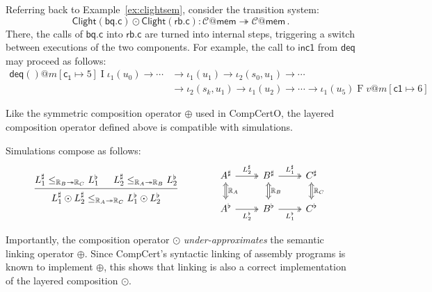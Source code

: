 \documentclass[acmsmall,screen,review,anonymous]{acmart}
\newcommand{\kw}[1]{\ensuremath{ \mathsf{#1} }}
\begin{document}
\begin{example}
Referring back to Example~\ref{ex:clightsem},
consider the transition system:
\[
  \kw{Clight}(\kw{bq.c}) \odot \kw{Clight}(\kw{rb.c}) :
  \mathcal{C}@\kw{mem} \twoheadrightarrow \mathcal{C}@\kw{mem}
  \,.
\]
There,
the calls of $\kw{bq.c}$ into $\kw{rb.c}$
are turned into internal steps,
triggering a switch between executions of the two components.
For example,
the call to $\kw{inc1}$ from $\kw{deq}$
may proceed as follows:
\begin{align*}
  \kw{deq}()@m[\kw{c_1} \mapsto 5] \mathrel{I} \iota_1(u_0)
  \rightarrow \cdots &\rightarrow \iota_1(u_1)
  \rightarrow \iota_2(s_0, u_1)
  \rightarrow \cdots \\ &\rightarrow \iota_2(s_k, u_1)
  \rightarrow \iota_1(u_2) \rightarrow \cdots
  \rightarrow \iota_1(u_5) \mathrel{F} v@m[\kw{c1} \mapsto 6]
\end{align*}
\end{example}

Like the symmetric composition operator $\oplus$ used in CompCertO,
the layered composition operator defined above
is compatible with simulations.

\begin{theorem} \label{thm:lcompsim}
Simulations compose as follows:
\[
  \begin{prooftree}
    \hypo{L_1^\sharp
          \le_{\mathbb{R}_B \twoheadrightarrow \mathbb{R}_C}
          L_1^\flat}
    \hypo{L_2^\sharp
          \le_{\mathbb{R}_A \twoheadrightarrow \mathbb{R}_B}
          L_2^\flat}
    \infer2{L_1^\sharp \odot L_2^\sharp
          \le_{\mathbb{R}_A \twoheadrightarrow \mathbb{R}_C}
          L_1^\flat \odot L_2^\flat}
  \end{prooftree}
  \qquad \qquad
  \begin{tikzcd}
    A^\sharp \ar[r, twoheadrightarrow, "L_2^\sharp"]
             \ar[d, Leftrightarrow, "\mathbb{R}_A"] &
    B^\sharp \ar[r, twoheadrightarrow, "L_1^\sharp"]
             \ar[d, Leftrightarrow, "\mathbb{R}_B"] &
    C^\sharp \ar[d, Leftrightarrow, "\mathbb{R}_C"]
    \\
    A^\flat \ar[r, twoheadrightarrow, "L_2^\flat"'] &
    B^\flat \ar[r, twoheadrightarrow, "L_1^\flat"'] &
    C^\flat
  \end{tikzcd}
\]
\end{theorem}

Importantly,
the composition operator $\odot$
\emph{under-approximates}
the semantic linking operator $\oplus$.
Since CompCert's syntactic linking of assembly programs
is known to implement $\oplus$,
this shows that linking is also a correct implementation of
the layered composition $\odot$.
\end{document}
